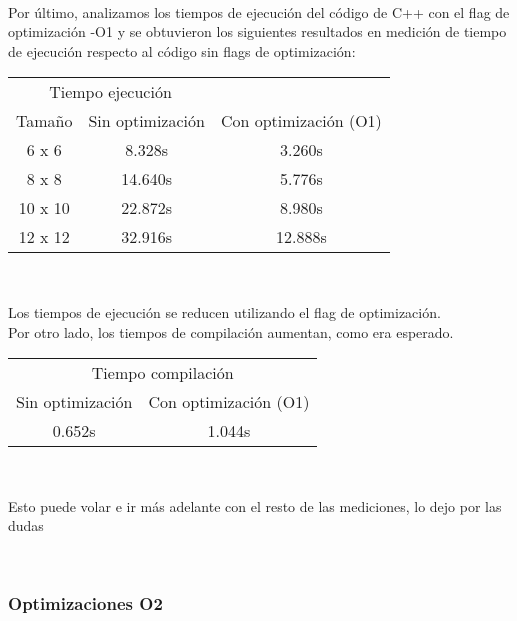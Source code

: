 ~\\


Por último, analizamos los tiempos de ejecución del código de C++ con el flag de optimización -O1 y se obtuvieron los siguientes resultados en medición de tiempo de ejecución respecto al código sin flags de optimización:\\

\begin{center}
	\begin{tabular}{ccc}  
		\toprule 
		\multicolumn{2}{c}{Tiempo ejecución} \\
		\cmidrule(r){1-3}
		Tamaño & Sin optimización & Con optimización (O1)  \\
		\midrule
		6 x 6   &	8.328s 	&	3.260s	\\
		8 x 8	&	14.640s	&	5.776s	\\
		10 x 10	&	22.872s	&	8.980s	\\
		12 x 12 &	32.916s &   12.888s \\
		\bottomrule
	\end{tabular}\\
\end{center}

Los tiempos de ejecución se reducen utilizando el flag de optimización.\\
Por otro lado, los tiempos de compilación aumentan, como era esperado.

\begin{center}
  \begin{tabular}{cc}  
    \toprule 
    \multicolumn{2}{c}{Tiempo compilación} \\
    \cmidrule(r){1-2}
    Sin optimización & Con optimización (O1) \\
    \midrule
    0.652s  & 1.044s  \\
    \bottomrule
  \end{tabular}\\
\end{center}


  \colorbox{BurntOrange}{Esto puede volar e ir más adelante con el resto de las mediciones, lo dejo por las dudas}

~\\



\subsubsection{Optimizaciones O2}


